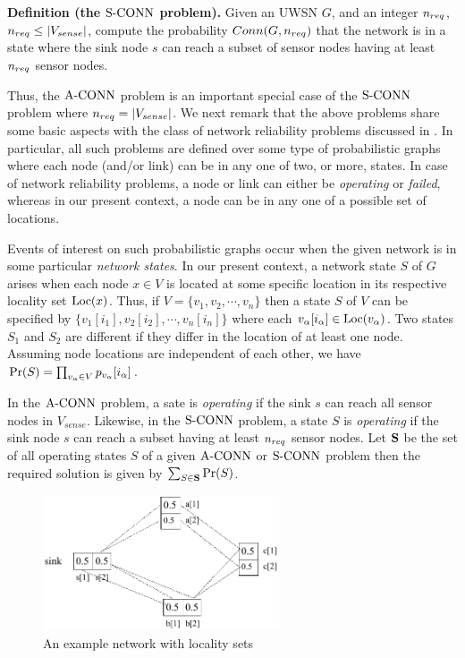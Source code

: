 \nwline
{\bf Definition (the ${\mathrm {S\mbox{-}CONN}}$ problem).}
    Given an UWSN $G$, and an integer ${n_{req}}$, ${n_{req}} \leq |V_{sense}|$,
    compute the probability $Conn(G,{n_{req}})$ that the network is in a state
    where the sink node $s$ can reach a subset of sensor nodes having at
    least ${n_{req}}$ sensor nodes.
\IEEEQED

\nwline
Thus, the ${\mathrm {A\mbox{-}CONN}}$ problem is an important special case of the ${\mathrm {S\mbox{-}CONN}}$
problem where ${n_{req}}= |V_{sense}|$.
%
We next remark that the above problems share some basic aspects
with the class of network reliability problems discussed in \cite{Co87}.
%
In particular, all such problems are defined over some type of probabilistic
graphs where each node (and/or link) can be in any one of two, or more,
states.
%
In case of network reliability problems, a node or link can either be
{\em operating} or {\em failed}, whereas in our present context, a node
can be in any one of a possible set of locations.
%

Events of interest on such probabilistic graphs occur when the given network
is in some particular {\em network states}.
%
In our present context, a network state $S$ of $G$ arises when each node
$x \in V$ is located at some specific location in its respective locality
set ${\mathrm {Loc}}(x)$.
%
Thus, if $V = \{v_1, v_2, \cdots, v_n \}$ then a state $S$ of $V$ can be
specified by $\{ v_1[i_1], v_2[i_2], \cdots, v_n[i_n] \}$ where
each $v_\alpha [i_\alpha] \in {\mathrm {Loc}}(v_\alpha)$.
%
Two states $S_1$ and $S_2$ are different if they differ in the location 
of at least one node.
%
Assuming node locations are independent of each other, we have
${\mathrm {Pr}}(S)= \prod_{v_\alpha \in V} p_{v_\alpha} [i_\alpha]$.

In the ${\mathrm {A\mbox{-}CONN}}$ problem, a sate is {\em operating} if the sink $s$
can reach all sensor nodes in $V_{sense}$.
%
Likewise, in the ${\mathrm {S\mbox{-}CONN}}$ problem, a state $S$ is {\em operating} if
the sink node $s$ can reach a subset having at least ${n_{req}}$ sensor nodes.
%
Let $\mathbf{S}$ be the set of all operating states $S$ of a given
${\mathrm {A\mbox{-}CONN}}$ or ${\mathrm {S\mbox{-}CONN}}$ problem then the required solution is given by
$\sum_{S \in \mathbf{S}} {\mathrm {Pr}}(S)$.

\vspace*{-0.15in}
    \begin{figure}[htbp]
    \begin{center}
    \includegraphics[width=2.75in]{4-node.pdf}
    \caption{An example network with locality sets}
    \label{fig:4node}
\vspace*{-0.25in}
    \end{center}
    \end{figure}

